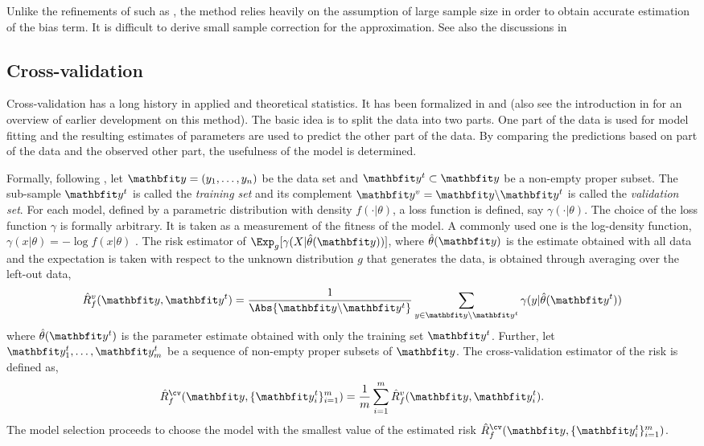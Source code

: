 Unlike the refinements of \aic such as \aicc, the \tic method relies heavily on the assumption of large sample size in order to obtain accurate estimation of the bias term. It is difficult to derive small sample correction for the \tic approximation. See also the discussions in \cite[][sec.~6.7.8]{Burnham:2002wc}

\subsection{Cross-validation}
\label{sub:Cross-validation}

Cross-validation has a long history in applied and theoretical statistics. It has been formalized in \cite{Geisser:1975vx} and \cite{Stone:1974vx} (also see the introduction in \cite{Stone:1974vx} for an overview of earlier development on this method). The basic idea is to split the data into two parts. One part of the data is used for model fitting and the resulting estimates of parameters are used to predict the other part of the data. By comparing the predictions based on part of the data and the observed other part, the usefulness of the model is determined.

Formally, following \cite{Geisser:1975vx}, let $\data = (y_1,\dots,y_n)$ be the data set and $\data^t\subset\data$ be a non-empty proper subset. The sub-sample $\data^t$ is called the \emph{training set} and its complement $\data^v = \data\backslash\data^t$ is called the \emph{validation set}. For each model, defined by a parametric distribution with density $f(\cdot|\theta)$, a loss function is defined, say $\gamma(\cdot|\theta)$. The choice of the loss function $\gamma$ is formally arbitrary. It is taken as a measurement of the fitness of the model. A commonly used one is the log-density function, $\gamma(x|\theta) = -\log f(x|\theta)$ \cite{Stone:1977vx}. The risk estimator of $\Exp_g[\gamma(X|\hat\theta(\data))]$, where $\hat\theta(\data)$ is the estimate obtained with all data and the expectation is taken with respect to the unknown distribution $g$ that generates the data, is obtained through averaging over the left-out data,
\begin{equation}
  \hat{R}_f^v(\data,\data^t) = \frac{1}{\Abs{\data\backslash\data^t}}
  \sum_{y\in\data\backslash\data^t}\gamma(y|\hat\theta(\data^t))
\end{equation}
where $\hat\theta(\data^t)$ is the parameter estimate obtained with only the training set $\data^t$. Further, let $\data_1^t,\dots,\data_m^t$ be a sequence of non-empty proper subsets of $\data$. The cross-validation estimator of the risk is defined as,
\begin{equation}
  \hat{R}_f^{\cv}(\data,\{\data_i^t\}_{i=1}^m) =
  \frac{1}{m}\sum_{i=1}^m \hat{R}_f^v(\data,\data_i^t).
\end{equation}
The model selection proceeds to choose the model with the smallest value of the estimated risk $\hat{R}_f^{\cv}(\data,\{\data_i^t\}_{i=1}^m)$.

